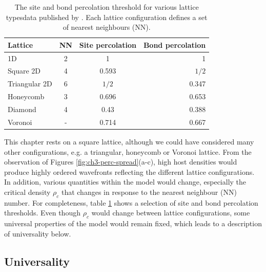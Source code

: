 \begin{table}[h!]
  \begin{center}
    \begin{tabular}{l|c|c|r} %
    \hline
      \textbf{Lattice} & NN & \textbf{Site percolation} & \textbf{Bond percolation}\\
      \hline
      1D & 2 & 1 & 1\\
      Square 2D & 4 & 0.593 & $1/2$\\
      Triangular 2D & 6 & $1/2$ & 0.347\\
      Honeycomb & 3 & 0.696 & 0.653\\
      Diamond & 4 & 0.43 & 0.388\\
      Voronoi & - & 0.714 & 0.667\\
    \hline
    \end{tabular}
    \caption{The site and bond percolation threshold for various lattice types\textemdash data published by \cite{stauffer2018introduction, PhysRevE.80.041101}.
            Each lattice configuration defines a set of nearest neighbours (NN).
    }
    \label{tab:perc}
  \end{center}
\end{table}

This chapter rests on a square lattice, although we could have considered many other configurations, e.g. a triangular, honeycomb or Voronoi lattice.
From the observation of Figures \ref{fig:ch3-perc-spread}(a-c),
high host densities would produce highly ordered wavefronts reflecting the different lattice configurations.
In addition, various quantities within the model would change, especially the critical density $\rho_c$ that changes in response to the nearest neighbour (NN) number.
For completeness, table \ref{tab:perc} shows a selection of site and bond percolation thresholds.
Even though $\rho_c$ would change between lattice configurations, some universal properties of the model would remain fixed, 
which leads to a description of universality below.


\subsection{Universality}

